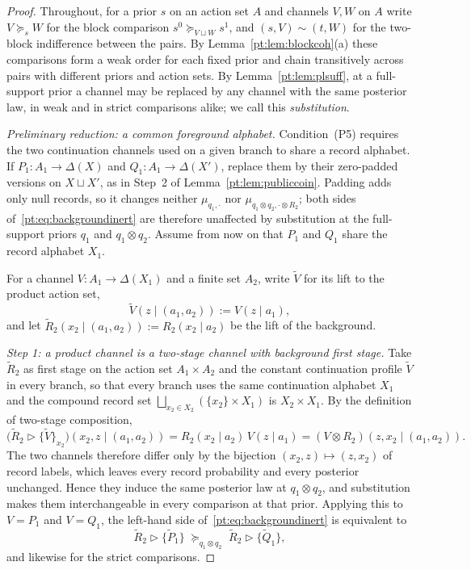 \documentclass[11pt,a4paper]{article}
\theoremstyle{definition}
\newcommand{\1}{\mathbf 1}
\begin{document}
\begin{proof}
Throughout, for a prior $s$ on an action set $A$ and channels $V,W$ on $A$ write $V\succeq_sW$ for the block comparison
$s^0\succeq_{V\sqcup W}s^1$, and $(s,V)\sim(t,W)$ for the two-block indifference between the pairs.  By
Lemma~\ref{pt:lem:blockcoh}(a) these comparisons form a weak order for each fixed prior and chain transitively across
pairs with different priors and action sets.  By Lemma~\ref{pt:lem:plsuff}, at a full-support prior a channel may be replaced by any channel with the
same posterior law, in weak and in strict comparisons alike; we call this \emph{substitution}.

\emph{Preliminary reduction: a common foreground alphabet.}
Condition~\textup{(P5)} requires the two continuation channels used on a given branch to share a record alphabet.  If
$P_1:A_1\to\Delta(X)$ and $Q_1:A_1\to\Delta(X')$, replace them by their zero-padded versions on $X\sqcup X'$, as in
Step~2 of Lemma~\ref{pt:lem:publiccoin}.  Padding adds only null records, so it changes neither $\mu_{q_1,\cdot}$ nor
$\mu_{q_1\otimes q_2,\cdot\otimes R_2}$; both sides of~\eqref{pt:eq:backgroundinert} are therefore unaffected by
substitution at the full-support priors $q_1$ and $q_1\otimes q_2$.  Assume from now on that $P_1$ and $Q_1$ share the
record alphabet $X_1$.

For a channel $V:A_1\to\Delta(X_1)$ and a finite set $A_2$, write $\widetilde V$ for its lift to the product action set,
\[
\widetilde V(z\mid(a_1,a_2)):=V(z\mid a_1),
\]
and let $\widetilde R_2(x_2\mid(a_1,a_2)):=R_2(x_2\mid a_2)$ be the lift of the background.

\emph{Step 1: a product channel is a two-stage channel with background first stage.}
Take $\widetilde R_2$ as first stage on the action set $A_1\times A_2$ and the constant continuation profile
$\widetilde V$ in every branch, so that every branch uses the same continuation alphabet $X_1$ and the compound record
set $\bigsqcup_{x_2\in X_2}(\{x_2\}\times X_1)$ is $X_2\times X_1$.  By the definition of two-stage composition,
\[
\bigl(\widetilde R_2\triangleright\{\widetilde V\}_{x_2}\bigr)(x_2,z\mid(a_1,a_2))
=R_2(x_2\mid a_2)\,V(z\mid a_1)
=(V\otimes R_2)(z,x_2\mid (a_1,a_2)).
\]
The two channels therefore differ only by the bijection $(x_2,z)\mapsto(z,x_2)$ of record labels, which leaves every
record probability and every posterior unchanged.  Hence they induce the same posterior law at $q_1\otimes q_2$, and
substitution makes them interchangeable in every comparison at that prior.  Applying this to $V=P_1$ and $V=Q_1$, the
left-hand side of~\eqref{pt:eq:backgroundinert} is equivalent to
\begin{equation}
\widetilde R_2\triangleright\{\widetilde P_1\}
\;\succeq_{q_1\otimes q_2}\;
\widetilde R_2\triangleright\{\widetilde Q_1\},
\tag{$\ast$}\label{pt:eq:bgcompound}
\end{equation}
and likewise for the strict comparisons.


\end{proof}
\end{document}
